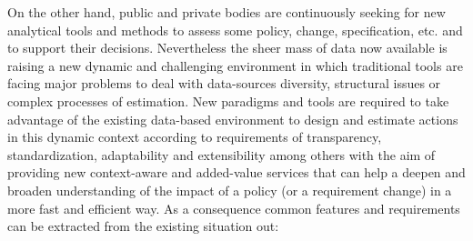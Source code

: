 On the other hand, public and private bodies are continuously seeking for new analytical tools and methods to assess some policy, change, specification, etc. and 
to support their decisions. Nevertheless the sheer mass of data now available is raising a new dynamic and challenging environment 
in which traditional tools are facing major problems to deal with data-sources diversity, structural issues or complex processes of estimation.
New paradigms and tools are required to take advantage of the existing data-based environment to design and estimate actions 
in this dynamic context according to requirements of transparency, standardization, adaptability and extensibility among others with the aim of providing new context-aware 
and added-value services that can help a deepen and broaden understanding of the impact of a policy (or a requirement change) in a more fast and efficient way. 
As a consequence common features and requirements can be extracted from the existing situation out:
